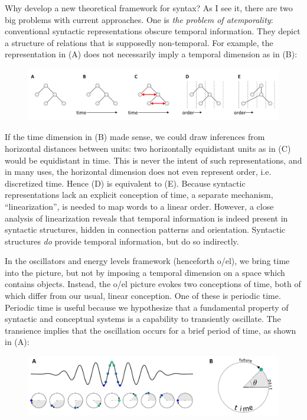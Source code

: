 Why develop a new theoretical framework for syntax? As I see it, there are two big problems with current approaches. One is \textit{the problem of atemporality}: conventional syntactic representations obscure temporal information. They depict a structure of relations that is supposedly non-temporal. For example, the representation in (A) does not necessarily imply a temporal dimension as in (B): 

  
\begin{figure}
\includegraphics[width=\textwidth]{figures/Tilsen-img1.png}
\caption{\missingcaption}
\label{fig:}
\end{figure}
 

  If the time dimension in (B) made sense, we could draw inferences from horizontal distances between units: two horizontally equidistant units as in (C) would be equidistant in time. This is never the intent of such representations, and in many uses, the horizontal dimension does not even represent order, i.e. discretized time. Hence (D) is equivalent to (E). Because syntactic representations lack an explicit conception of time, a separate mechanism, “linearization”, is needed to map words to a linear order.  However, a close analysis of linearization reveals that temporal information is indeed present in syntactic structures, hidden in connection patterns and orientation. Syntactic structures \textit{do} provide temporal information, but do so indirectly.

  In the oscillators and energy levels framework (henceforth o/el), we bring time into the picture, but not by imposing a temporal dimension on a space which contains objects. Instead, the o/el picture evokes two conceptions of time, both of which differ from our usual, linear conception. One of these is periodic time. Periodic time is useful because we hypothesize that a fundamental property of syntactic and conceptual systems is a capability to transiently oscillate. The transience implies that the oscillation occurs for a brief period of time, as shown in (A): 

  
\begin{figure}
\includegraphics[width=\textwidth]{figures/Tilsen-img2.png}
\caption{\missingcaption}
\label{fig:}
\end{figure}
 

